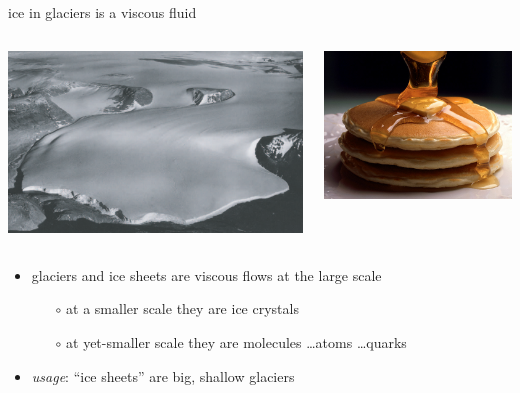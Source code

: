\documentclass[10pt,hyperref={pdfpagelabels=true}]{beamer}
\begin{document}
\begin{frame}{ice in glaciers is a viscous fluid}
\begin{columns}
\begin{column}{0.65\textwidth}
\includegraphics[width=1.0\textwidth]{polaris}
\end{column}
\begin{column}{0.35\textwidth}
\includegraphics[width=1.0\textwidth]{pancakes}
\end{column}
\end{columns}

\bigskip
\begin{itemize}
\item glaciers and ice sheets are viscous flows at the large scale
  \begin{itemize}
  \item[$\circ$] at a smaller scale they are ice crystals
  \item[$\circ$] at yet-smaller scale they are molecules \dots atoms \dots quarks
  \end{itemize}
\item \emph{usage}: ``ice sheets'' are big, shallow glaciers
\end{itemize}
\end{frame}
\end{document}
